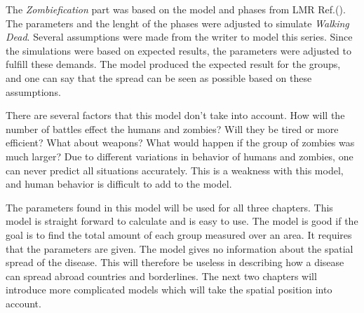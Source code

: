 \documentclass[%
twoside,                 %
final,                   %
chapterprefix=true,      %
open=right               %
10pt]{book}
\begin{document}
\vspace{3mm}




\vspace{3mm}


The \emph{Zombiefication} part was based on the model and phases from LMR Ref.(\cite{zombie-math}). The parameters and the lenght of the phases were adjusted to simulate \emph{Walking Dead}. Several assumptions were made from the writer to model this series. Since the simulations were based on expected results, the parameters were adjusted to fulfill these demands. The model produced the expected result for the groups, and one can say that the spread can be seen as possible based on these assumptions.    


\vspace{3mm}




\vspace{3mm}


There are several factors that this model don't take into account. How will the number of battles effect the humans and zombies? Will they be tired or more efficient? What about weapons? What would happen if the group of zombies was much larger? Due to different variations in behavior of humans and zombies, one can never predict all situations accurately. This is a weakness with this model, and human behavior is difficult to add to the model.  


\vspace{3mm}




\vspace{3mm}


The parameters found in this model will be used for all three chapters. This model is straight forward to calculate and is easy to use. The model is good if the goal is to find the total amount of each group measured over an area. It requires that the parameters are given. The model gives no information about the spatial spread of the disease. This will therefore be useless in describing how a disease can spread abroad countries and borderlines. The next two chapters will introduce more complicated models which will take the spatial position into account. 
\end{document}
